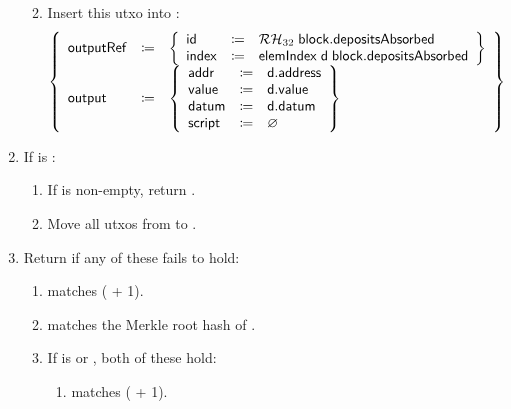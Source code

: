 \documentclass[../hydrozoa.tex]{subfiles}
\begin{document}
\begin{enumerate}
\begin{enumerate}
\begin{equation*}
        \end{equation*}
      \item Insert this utxo into :
        \begin{equation*}
          \left\{
          \begin{array}{lll}
            \mathsf{outputRef} &\coloneq& \left\{
              \begin{array}{lll}
                \mathsf{id} &\coloneq& \mathcal{RH}_{32} \; \mathsf{block.depositsAbsorbed} \\
                \mathsf{index} &\coloneq& \mathsf{elemIndex} \; \mathsf{d} \; \mathsf{block.depositsAbsorbed}
              \end{array}\right\} \\
            \mathsf{output} &\coloneq& \left\{
              \begin{array}{lll}
                \mathsf{addr} &\coloneq& \mathsf{d.address} \\
                \mathsf{value} &\coloneq& \mathsf{d.value} \\
                \mathsf{datum} &\coloneq& \mathsf{d.datum} \\
                \mathsf{script} &\coloneq& \varnothing
              \end{array}\right\}
          \end{array}\right\}
        \end{equation*}
    \end{enumerate}
  \item If  is :
    \begin{enumerate}
      \item If  is non-empty, return .
      \item Move all utxos from  to .
    \end{enumerate}
  \item Return  if any of these fails to hold:
    \begin{enumerate}
      \item {} matches ( + 1).
      \item {} matches the Merkle root hash of .
      \item If  is  or , both of these hold:
        \begin{enumerate}
          \item {} matches ( + 1).

\end{enumerate}
\end{enumerate}
\end{enumerate}
\end{document}
